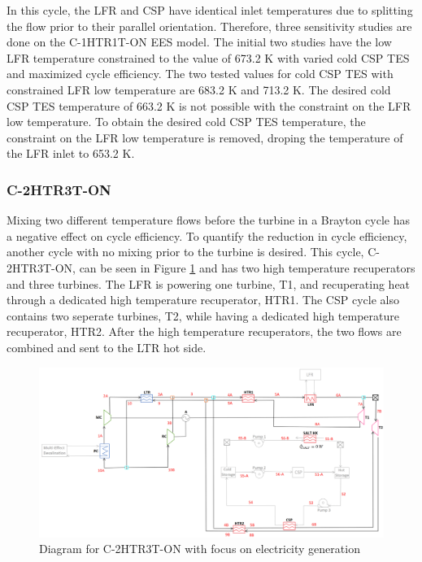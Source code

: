 \begin{paracol}{2}
\linenumbers
\switchcolumn

In this cycle, the LFR and CSP have identical inlet temperatures due to splitting the flow prior to their parallel orientation. Therefore, three sensitivity studies are done on the C-1HTR1T-ON EES model. The initial two studies have the low LFR temperature constrained to the value of 673.2 K with varied cold CSP TES and maximized cycle efficiency. The two tested values for cold CSP TES with constrained LFR low temperature are 683.2 K and 713.2 K. The desired cold CSP TES temperature of 663.2 K is not possible with the constraint on the LFR low temperature. To obtain the desired cold CSP TES temperature, the constraint on the LFR low temperature is removed, droping the temperature of the LFR inlet to 653.2 K. 


\subsubsection{C-2HTR3T-ON} %

Mixing two different temperature flows before the turbine in a Brayton cycle has a negative effect on cycle efficiency. To quantify the reduction in cycle efficiency, another cycle with no mixing prior to the turbine is desired. This cycle, C-2HTR3T-ON, can be seen in Figure \ref{c-2htr3t-on} and has two high temperature recuperators and three turbines. The LFR is powering one turbine, T1, and recuperating heat through a dedicated high temperature recuperator, HTR1. The CSP cycle also contains two seperate turbines, T2, while having a dedicated high temperature recuperator, HTR2. After the high temperature recuperators, the two flows are combined and sent to the LTR hot side. 

\end{paracol}
\begin{figure}[H]
    \widefigure
    \includegraphics[width=\linewidth]{Definitions/c-2htr3t-on.pdf}
    \caption{Diagram for C-2HTR3T-ON with focus on electricity generation\label{c-2htr3t-on}}
\end{figure}
